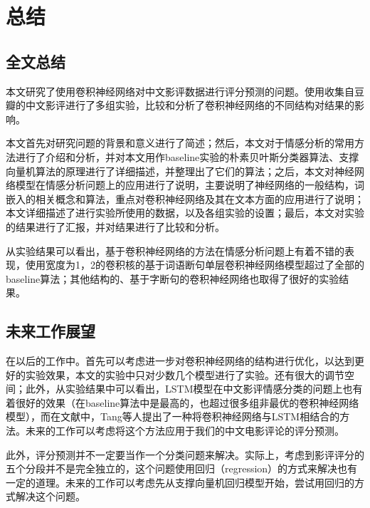 \chapter{总结}

\section{全文总结}
本文研究了使用卷积神经网络对中文影评数据进行评分预测的问题。使用收集自豆瓣的中文影评进行了多组实验，比较和分析了卷积神经网络的不同结构对结果的影响。

本文首先对研究问题的背景和意义进行了简述；然后，本文对于情感分析的常用方法进行了介绍和分析，并对本文用作baseline实验的朴素贝叶斯分类器算法、支撑向量机算法的原理进行了详细描述，并整理出了它们的算法；之后，本文对神经网络模型在情感分析问题上的应用进行了说明，主要说明了神经网络的一般结构，词嵌入的相关概念和算法，重点对卷积神经网络及其在文本方面的应用进行了说明；本文详细描述了进行实验所使用的数据，以及各组实验的设置；最后，本文对实验的结果进行了汇报，并对结果进行了比较和分析。

从实验结果可以看出，基于卷积神经网络的方法在情感分析问题上有着不错的表现，使用宽度为1，2的卷积核的基于词语断句单层卷积神经网络模型超过了全部的baseline算法；其他结构的、基于字断句的卷积神经网络也取得了很好的实验结果。

\section{未来工作展望}
在以后的工作中。首先可以考虑进一步对卷积神经网络的结构进行优化，以达到更好的实验效果，本文的实验中只对少数几个模型进行了实验。还有很大的调节空间；此外，从实验结果中可以看出，LSTM模型在中文影评情感分类的问题上也有着很好的效果（在baseline算法中是最高的，也超过很多组非最优的卷积神经网络模型），而在文献\cite{tang2015document}中，Tang等人提出了一种将卷积神经网络与LSTM相结合的方法。未来的工作可以考虑将这个方法应用于我们的中文电影评论的评分预测。

此外，评分预测并不一定要当作一个分类问题来解决。实际上，考虑到影评评分的五个分段并不是完全独立的，这个问题使用回归（regression）的方式来解决也有一定的道理。未来的工作可以考虑先从支撑向量机回归模型开始，尝试用回归的方式解决这个问题。

